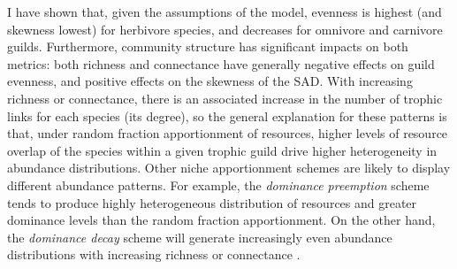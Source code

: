 I have shown that, given the assumptions of the model, evenness is highest (and skewness lowest) for herbivore species, and decreases for omnivore and carnivore guilds. Furthermore, community structure has significant impacts on both metrics: both richness and connectance have generally negative effects on guild evenness, and positive effects on the skewness of the SAD. With increasing richness or connectance, there is an associated increase in the number of trophic links for each species (its degree), so the general explanation for these patterns is that, under random fraction apportionment of resources, higher levels of resource overlap of the species within a given trophic guild drive higher heterogeneity in abundance distributions. Other niche apportionment schemes are likely to display different abundance patterns. For example, the \textit{dominance preemption} scheme tends to produce highly heterogeneous distribution of resources and greater dominance levels than the random fraction apportionment. On the other hand, the \textit{dominance decay} scheme will generate increasingly even abundance distributions with increasing richness or connectance \citep{Tokeshi1990}.

